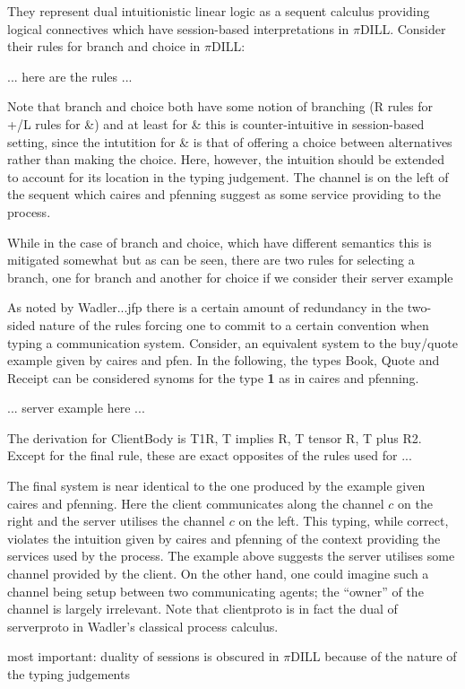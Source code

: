 \documentclass{mprop}
\newcommand{\1}{\textbf{1}\xspace}
\begin{document}
They represent dual intuitionistic linear logic as a sequent calculus
providing logical connectives which have session-based interpretations in
$\pi$DILL. Consider their rules for branch and choice in $\pi$DILL:

... here are the rules ...

Note that branch and choice both have some notion of branching (R rules for
+/L rules for \&) and at least for \& this is counter-intuitive in
session-based setting, since the intutition for \& is that of offering a
choice between alternatives rather than making the choice. Here, however, the
intuition should be extended to account for its location in the typing
judgement. The channel is on the left of the sequent which caires and pfenning
suggest as some service providing to the process.

While in the case of branch and choice, which have different semantics this is
mitigated somewhat but as can be seen, there are two rules for selecting a
branch, one for branch and another for choice if we consider their server
example

As noted by Wadler...jfp there is a certain amount of redundancy in the
two-sided nature of the rules forcing one to commit to a certain convention
when typing a communication system. Consider, an equivalent system to the
buy/quote example given by caires and pfen. In the following, the types Book,
Quote and Receipt can be considered synoms for the type \1 as in caires and
pfenning.

... server example here ...

The derivation for ClientBody is T1R, T implies R, T tensor R, T plus
R2. Except for the final rule, these are exact opposites of the rules used for
...

The final system is near identical to the one produced by the example given
caires and pfenning. Here the client communicates along the channel $c$ on the
right and the server utilises the channel $c$ on the left. This typing, while
correct, violates the intuition given by caires and pfenning of the context
providing the services used by the process. The example above suggests the
server utilises some channel provided by the client. On the other hand, one
could imagine such a channel being setup between two communicating agents; the
``owner'' of the channel is largely irrelevant. Note that clientproto is in
fact the dual of serverproto in Wadler's classical process calculus.

most important: duality of sessions is obscured in $\pi$DILL because of the
nature of the typing judgements
\end{document}
